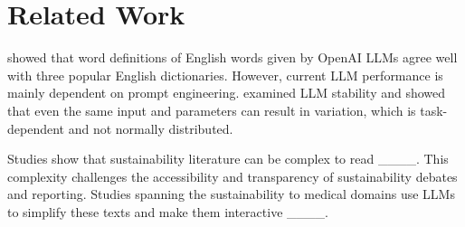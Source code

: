 \section{Related Work}
 showed that word definitions of English words given by OpenAI LLMs agree well with three popular English dictionaries. However, current LLM performance is mainly dependent on prompt engineering.  examined LLM stability and showed that even the same input and parameters can result in variation, which is task-dependent and not normally distributed.

Studies show that sustainability literature can be complex to read ____. This complexity challenges the accessibility and transparency of sustainability debates and reporting. Studies spanning the sustainability to medical domains use LLMs to simplify these texts and make them interactive ____.